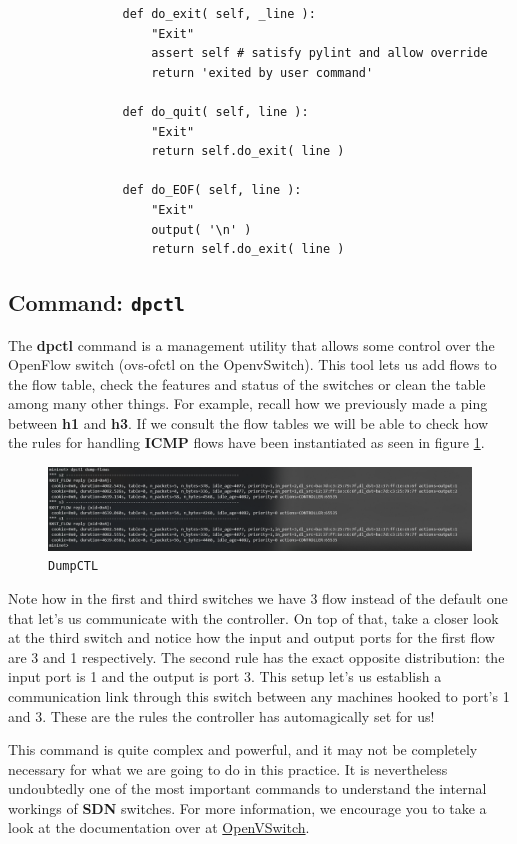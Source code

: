 \documentclass[12pt]{report}
\newcommand{\newpar} {
    \vskip 1cm
}
\begin{document}
			\begin{verbatim}
				def do_exit( self, _line ):
					"Exit"
					assert self # satisfy pylint and allow override
					return 'exited by user command'

				def do_quit( self, line ):
					"Exit"
					return self.do_exit( line )

				def do_EOF( self, line ):
					"Exit"
					output( '\n' )
					return self.do_exit( line )
			\end{verbatim}

		\subsection{Command: \texttt{dpctl}}
			The \textbf{dpctl} command is a management utility that allows some control over the OpenFlow switch (ovs-ofctl on the OpenvSwitch). This tool lets us add flows to the flow table, check the features and status of the switches or clean the table among many other things. For example, recall how we previously made a ping between \textbf{h1} and \textbf{h3}. If we consult the flow tables we will be able to check how the rules for handling \textbf{ICMP} flows have been instantiated as seen in figure \ref{f:dpctl}.

			\begin{figure}
				\centering
				\includegraphics[scale = 1]{dpctl.png}
				\caption{\texttt{DumpCTL}}
				\label{f:dpctl}
			\end{figure}

			Note how in the first and third switches we have 3 flow instead of the default one that let's us communicate with the controller. On top of that, take a closer look at the third switch and notice how the input and output ports for the first flow are 3 and 1 respectively. The second rule has the exact opposite distribution: the input port is 1 and the output is port 3. This setup let's us establish a communication link through this switch between any machines hooked to port's 1 and 3. These are the rules the controller has automagically set for us!
			\newpar
			This command is quite complex and powerful, and it may not be completely necessary for what we are going to do in this practice. It is nevertheless undoubtedly one of the most important commands to understand the internal workings of \textbf{SDN} switches. For more information, we encourage you to take a look at the documentation over at \href{http://www.openvswitch.org/support/dist-docs/ovs-ofctl.8.txt}{OpenVSwitch}.
\end{document}
